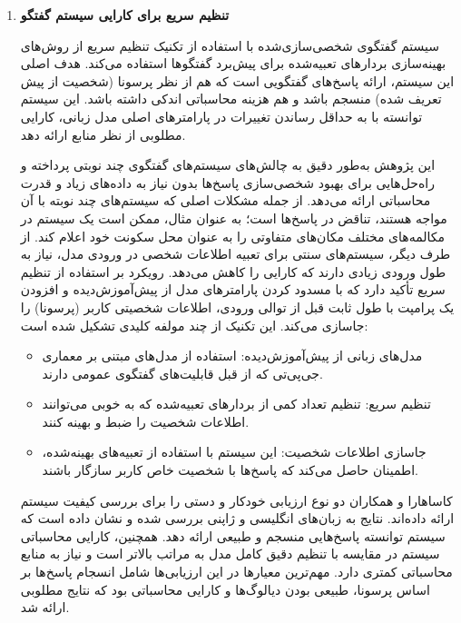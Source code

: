 \begin{enumerate}
\item
\textbf{تنظیم سریع برای کارایی سیستم گفتگو}

سیستم گفتگوی شخصی‌سازی‌شده با استفاده از تکنیک تنظیم سریع%
\cite{kasahara2022building}
 از روش‌های بهینه‌سازی 
بردارهای تعبیه‌شده%
 برای پیش‌برد گفتگوها استفاده می‌کند. هدف اصلی این سیستم، ارائه پاسخ‌های گفتگویی است که هم از نظر 
پرسونا%
(شخصیت از پیش تعریف شده) منسجم باشد و هم هزینه محاسباتی اندکی داشته باشد. این سیستم توانسته با به‌ حداقل رساندن تغییرات در پارامترهای اصلی مدل زبانی، کارایی مطلوبی از نظر منابع ارائه دهد.

این پژوهش به‌طور دقیق به چالش‌های 
سیستم‌های گفتگوی چند نوبتی%
پرداخته و راه‌حل‌هایی برای بهبود شخصی‌سازی پاسخ‌ها بدون نیاز به داده‌های زیاد و قدرت محاسباتی ارائه می‌دهد. از جمله مشکلات اصلی که سیستم‌های چند نوبته با آن مواجه هستند، تناقض در پاسخ‌ها است؛ به عنوان مثال، ممکن است یک سیستم در مکالمه‌های مختلف مکان‌های متفاوتی را به عنوان محل سکونت خود اعلام کند. از طرف دیگر، سیستم‌های سنتی برای تعبیه اطلاعات شخصی در ورودی مدل، نیاز به طول ورودی زیادی دارند که کارایی را کاهش می‌دهد.
\newline
رویکرد %
\cite{kasahara2022building}
 بر استفاده از تنظیم سریع تأکید دارد که با مسدود کردن پارامترهای مدل از پیش‌آموزش‌دیده و افزودن یک پرامپت با طول ثابت قبل از توالی ورودی، اطلاعات شخصیتی کاربر (پرسونا) را جاسازی می‌کند. 
\newline
این تکنیک از چند مولفه کلیدی تشکیل شده است:
\begin{itemize}
\item
مدل‌های زبانی از پیش‌آموزش‌دیده: استفاده از مدل‌های مبتنی بر معماری جی‌پی‌تی که از قبل قابلیت‌های گفتگوی عمومی دارند.
\item
تنظیم سریع: تنظیم تعداد کمی از بردارهای تعبیه‌شده که به خوبی می‌توانند اطلاعات شخصیت را ضبط و بهینه کنند.
\item
جاسازی اطلاعات شخصیت: این سیستم با استفاده از تعبیه‌های بهینه‌شده، اطمینان حاصل می‌کند که پاسخ‌ها با شخصیت خاص کاربر سازگار باشند.
\end{itemize}

کاساهارا و همکاران%
\cite{kasahara2022building}
 دو نوع ارزیابی خودکار و دستی را برای بررسی کیفیت سیستم ارائه داده‌اند. نتایج به زبان‌های انگلیسی و ژاپنی بررسی شده و نشان داده است که سیستم توانسته پاسخ‌هایی منسجم و طبیعی ارائه دهد. همچنین، کارایی محاسباتی سیستم در مقایسه با تنظیم دقیق کامل مدل به مراتب بالاتر است و نیاز به منابع محاسباتی کمتری دارد. مهم‌ترین معیارها در این ارزیابی‌ها شامل انسجام پاسخ‌ها بر اساس پرسونا، طبیعی بودن دیالوگ‌ها و کارایی محاسباتی بود که نتایج مطلوبی ارائه شد.


\end{enumerate}

